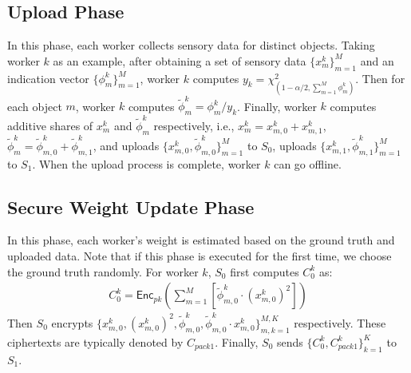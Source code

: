 \documentclass[conference]{IEEEtran}
\begin{document}
\subsection{Upload Phase}

In this phase, each worker collects sensory data for distinct objects.
Taking worker $k$ as an example, after obtaining a set of sensory data $\{x_m^k\}_{m=1}^M$ and an indication vector $\{\phi_m^k\}_{m=1}^M$, worker $k$ computes $y_k = \chi^2_{(1-\alpha/2, \sum_{m=1}^M \phi_m^k)}$.
Then for each object $m$, worker $k$ computes $\tilde{\phi}_m^k = \phi_m^k / y_k$.
Finally, worker $k$ computes additive shares of $x_m^k$ and $\tilde{\phi}_m^k$ respectively, i.e., $x_m^k = x_{m,0}^k + x_{m,1}^k$, $\tilde{\phi}_m^k = \tilde{\phi}_{m,0}^k + \tilde{\phi}_{m,1}^k$, and uploads $\{x_{m,0}^k, \tilde{\phi}_{m,0}^k\}_{m=1}^M$ to $S_0$, uploads $\{x_{m,1}^k, \tilde{\phi}_{m,1}^k\}_{m=1}^M$ to $S_1$.
When the upload process is complete, worker $k$ can go offline.

\subsection{Secure Weight Update Phase}

In this phase, each worker's weight is estimated based on the ground truth and uploaded data.
Note that if this phase is executed for the first time, we choose the ground truth randomly.
For worker $k$, $S_0$ first computes $C_0^k$ as: 
\begin{equation}
  \begin{split}
  C_0^k = \mathsf{Enc}_{pk}(\sum_{m=1}^M [\tilde{\phi}_{m,0}^k\cdot (x_{m,0}^k)^2])
  \end{split}
\end{equation}
Then $S_0$ encrypts $\{x_{m,0}^k, (x_{m,0}^k)^2, \tilde{\phi}_{m,0}^k,\tilde{\phi}_{m,0}^k\cdot x_{m,0}^k\}_{m,k=1}^{M,K}$ respectively.
These ciphertexts are typically denoted by $C_{pack1}$.
Finally, $S_0$ sends $\{C_0^k, C_{pack1}^k\}_{k=1}^K$ to $S_1$.
\end{document}
